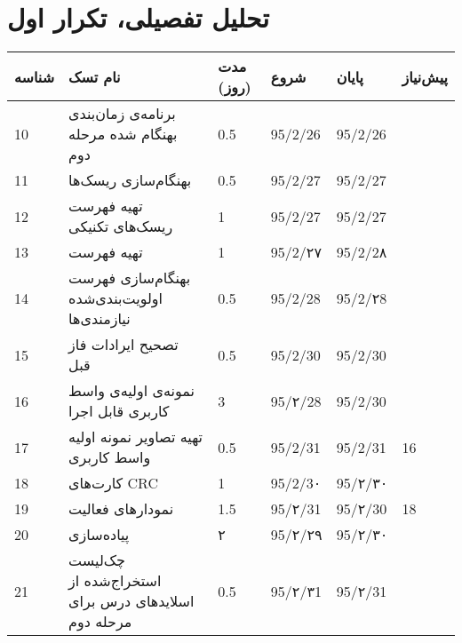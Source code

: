\section{تحلیل تفصیلی، تکرار اول}	
\begin{tabular}[H]{ | l | l | l | l | l | l | }
	\hline
	شناسه & نام تسک & مدت (روز) & شروع & پایان & پیش‌نیاز    \\ \hline
	10 & برنامه‌ی زمان‌بندی‌ بهنگام شده مرحله دوم & 0.5   &   95/2/26 &   95/2/26 &      \\ \hline
	11 & بهنگام‌سازی ریسک‌ها & 0.5   &   95/2/27 &   95/2/27 &      \\ \hline
	12 & تهیه  فهرست ریسک‌های تکنیکی & 1   &   95/2/27 &   95/2/27 &      \\ \hline
	13 & تهیه فهرست \lr{Architecturally Significant Requirements} & 1   &   95/2/۲۷ &   95/2/2۸ &      \\ \hline
	14 &  بهنگام‌سازی فهرست اولویت‌بندی‌شده نیازمندی‌ها & 0.5   &   95/2/28 &   95/2/۲8 &      \\ \hline
		 15&  تصحیح ایرادات فاز قبل & 0.5   &   95/2/30 &   95/2/30 &      \\ \hline
	16 & نمونه‌ی اولیه‌ی واسط کاربری قابل اجرا & 3 &   95/۲/28 &   95/2/30 &  \\ \hline
	17 & تهیه تصاویر نمونه اولیه واسط کاربری  & 0.5 & 95/2/31 &   95/2/31 & 16 \\ \hline
	18 & کارت‌های CRC & 1   &   95/2/3۰ &   95/۲/۳۰ &      \\ \hline
	19 & نمودارهای فعالیت  & 1.5  &   95/۲/31 &   95/۲/30 &   18   \\ \hline
	20 & پیاده‌سازی \lr{Executable Architectural Baseline} & ۲   &   95/۲/۲۹ &   95/۲/۳۰ &      \\ \hline
	21 &  چک‌لیست استخراج‌شده از اسلایدهای درس برای مرحله دوم &  0.5 &   95/۲/۳1 &   95/۲/31 &  \\ \hline
\end{tabular}


